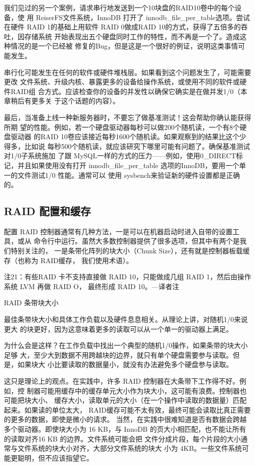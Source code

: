 我们见过的另一个案例，请求串行地发送到一个10块盘的RAID10卷中的每个设备，使
用 ReiserFS文件系统，InnoDB 打开了 innodb\_file\_per\_table选项。尝试在硬件 RAID
1的基础上用软件 RAID 0做成RAID 10的方式，获得了五倍多的吞吐，因存储系统
开始表现出五个硬盘同时工作的特性，而不再是一个了。造成这种情况的是一个已经被
修复的Bug，但是这是一个很好的例证，说明这类事情可能发生。

串行化可能发生在任何的软件或硬件堆栈层。如果看到这个问题发生了，可能需要更改
文件系统、升级内核、暴露更多的设备给操作系统，或使用不同的软件或硬件RAID组
合方式。应该检查你的设备的并发性以确保它确实是在做并发1/0（本章稍后有更多关
于这个话题的内容）。

最后，当准备上线一种新服务器时，不要忘了做基准测试！这会帮助你确认能获得所期
望的性能。例如，若一个硬盘驱动器每秒可以做200个随机读，一个有8个硬盘驱动器
的RAID 10卷应该接近每秒1600个随机读。如果观察到的结果比这个少得多，比如说
每秒500个随机读，就应该研究下哪里可能有问题了。确保基准测试对1/0子系统施加
了跟 MySQL一样的方式的压力——例如，使用0\_DIRECT标记，并且如果使用没有打开
innodb\_file\_per\_table 选项的InnoDB，要用一个单一的文件测试1/0 性能。通常可以
使用 sysbench来验证新的硬件设置都是正确的。

\subsection{RAID 配置和缓存}
配置 RAID 控制器通常有几种方法，一是可以在机器启动时进入自带的设置工具，或从
命令行中运行。虽然大多数控制器提供了很多选项，但其中有两个是我们特别关注的，
一是条带化阵列的块大小（Chunk Size），还有就是控制器板载缓存（也称为 RAID缓存，
我们使用术语）。

注21：有些RAID 卡不支持直接做 RAID 10，只能做成几组 RAID 1，然后由操作系统 LVM 再做 RAID O，
最终形成 RAID 10。—译者注

RAID 条带块大小

最佳条带块大小和具体工作负载以及硬件息息相关。从理论上讲，对随机1/0来说更大
的块更好，因为这意味着更多的读取可以从一个单一的驱动器上满足。

为什么会是这样？在工作负载中找出一个典型的随机1/0操作，如果条带的块大小足够
大，至少大到数据不用跨越块的边界，就只有单个硬盘需要参与读取。但是，如果块大
小比要读取的数据量小，就没有办法避免多个硬盘参与读取。

这只是理论上的观点。在实践中，许多 RAID 控制器在大条带下工作得不好。例如，控
制器可能用缓存中的缓存单元大小作为块大小，这可能有浪费。控制器也可能把块大小、
缓存大小，读取单元的大小（在一个操作中读取的数据量）匹配起来。如果读的单位太大，
RAID缓存可能不太有效，最终可能会读取比真正需要的更多的数据，即使是微小的请求。
当然，在实践中很难知道是否有数据会跨越多个驱动器。即使块大小为 16 KB，与
InnoDB 的页大小相匹配，也不能让所有的读取对齐16 KB 的边界。文件系统可能会把
文件分成片段，每个片段的大小通常与文件系统的块大小对齐，大部分文件系统的块大
小为 4KB。一些文件系统可能更聪明，但不应该指望它。

